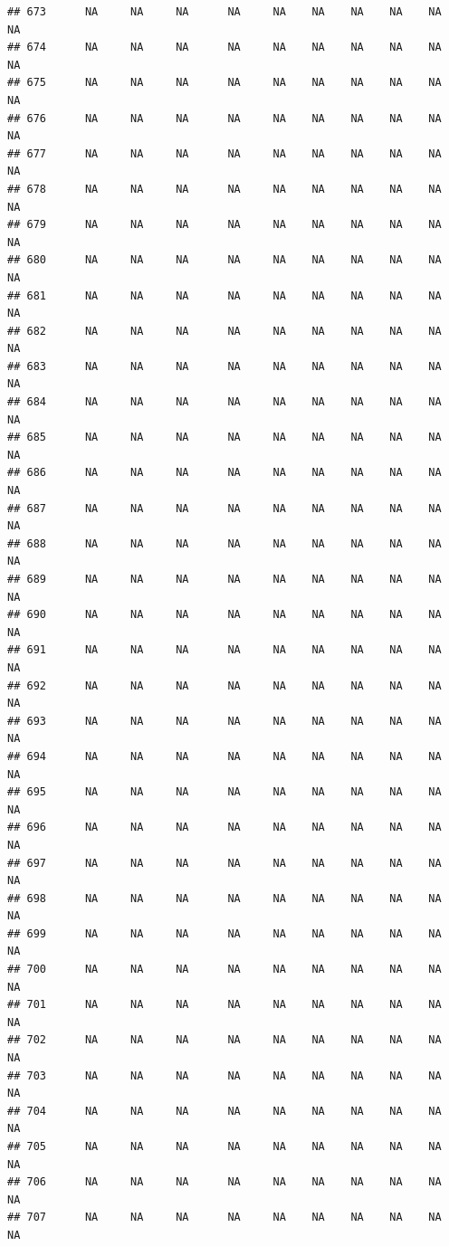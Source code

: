 \documentclass{article}\usepackage{graphicx, color}
\makeatletter
\newenvironment{kframe}{%
 \def\at@end@of@kframe{}%
 \ifinner\ifhmode%
  \def\at@end@of@kframe{\end{minipage}}%
  \begin{minipage}{\columnwidth}%
 \fi\fi%
 \def\FrameCommand##1{\hskip\@totalleftmargin \hskip-\fboxsep
 \colorbox{shadecolor}{##1}\hskip-\fboxsep
     \hskip-\linewidth \hskip-\@totalleftmargin \hskip\columnwidth}%
 \MakeFramed {\advance\hsize-\width
   \@totalleftmargin\z@ \linewidth\hsize
   \@setminipage}}%
 {\par\unskip\endMakeFramed%
 \at@end@of@kframe}
\newenvironment{knitrout}{}{} %
\makeatother
\begin{document}
\begin{knitrout}
\begin{kframe}
\begin{verbatim}
## 673      NA     NA     NA      NA     NA    NA    NA    NA    NA     NA
## 674      NA     NA     NA      NA     NA    NA    NA    NA    NA     NA
## 675      NA     NA     NA      NA     NA    NA    NA    NA    NA     NA
## 676      NA     NA     NA      NA     NA    NA    NA    NA    NA     NA
## 677      NA     NA     NA      NA     NA    NA    NA    NA    NA     NA
## 678      NA     NA     NA      NA     NA    NA    NA    NA    NA     NA
## 679      NA     NA     NA      NA     NA    NA    NA    NA    NA     NA
## 680      NA     NA     NA      NA     NA    NA    NA    NA    NA     NA
## 681      NA     NA     NA      NA     NA    NA    NA    NA    NA     NA
## 682      NA     NA     NA      NA     NA    NA    NA    NA    NA     NA
## 683      NA     NA     NA      NA     NA    NA    NA    NA    NA     NA
## 684      NA     NA     NA      NA     NA    NA    NA    NA    NA     NA
## 685      NA     NA     NA      NA     NA    NA    NA    NA    NA     NA
## 686      NA     NA     NA      NA     NA    NA    NA    NA    NA     NA
## 687      NA     NA     NA      NA     NA    NA    NA    NA    NA     NA
## 688      NA     NA     NA      NA     NA    NA    NA    NA    NA     NA
## 689      NA     NA     NA      NA     NA    NA    NA    NA    NA     NA
## 690      NA     NA     NA      NA     NA    NA    NA    NA    NA     NA
## 691      NA     NA     NA      NA     NA    NA    NA    NA    NA     NA
## 692      NA     NA     NA      NA     NA    NA    NA    NA    NA     NA
## 693      NA     NA     NA      NA     NA    NA    NA    NA    NA     NA
## 694      NA     NA     NA      NA     NA    NA    NA    NA    NA     NA
## 695      NA     NA     NA      NA     NA    NA    NA    NA    NA     NA
## 696      NA     NA     NA      NA     NA    NA    NA    NA    NA     NA
## 697      NA     NA     NA      NA     NA    NA    NA    NA    NA     NA
## 698      NA     NA     NA      NA     NA    NA    NA    NA    NA     NA
## 699      NA     NA     NA      NA     NA    NA    NA    NA    NA     NA
## 700      NA     NA     NA      NA     NA    NA    NA    NA    NA     NA
## 701      NA     NA     NA      NA     NA    NA    NA    NA    NA     NA
## 702      NA     NA     NA      NA     NA    NA    NA    NA    NA     NA
## 703      NA     NA     NA      NA     NA    NA    NA    NA    NA     NA
## 704      NA     NA     NA      NA     NA    NA    NA    NA    NA     NA
## 705      NA     NA     NA      NA     NA    NA    NA    NA    NA     NA
## 706      NA     NA     NA      NA     NA    NA    NA    NA    NA     NA
## 707      NA     NA     NA      NA     NA    NA    NA    NA    NA     NA

\end{verbatim}
\end{kframe}
\end{knitrout}
\end{document}
